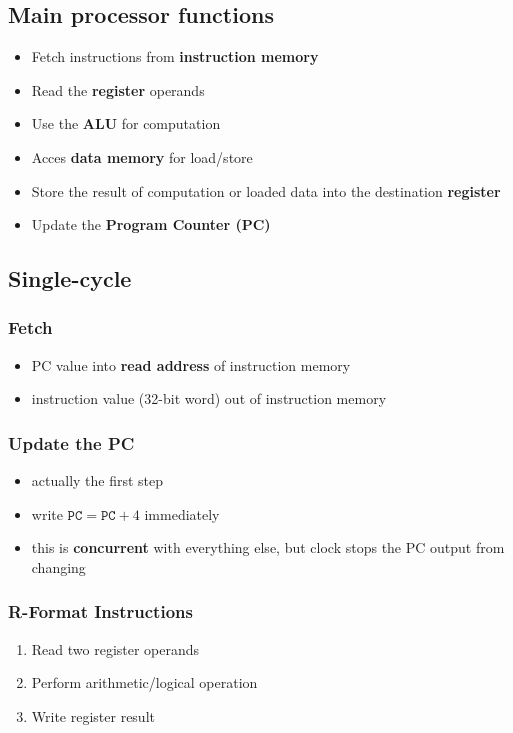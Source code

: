 \documentclass{article}
\begin{document}
\subsection{Main processor functions}
\begin{itemize}
	\item Fetch instructions from \textbf{instruction memory}
	\item Read the \textbf{register} operands
	\item Use the \textbf{ALU} for computation
	\item Acces \textbf{data memory} for load/store
	\item Store the result of computation or loaded data into the destination \textbf{register}
	\item Update the \textbf{Program Counter (PC)}
\end{itemize}
\subsection{Single-cycle}
\subsubsection{Fetch}
\begin{itemize}
	\item PC value into \textbf{read address} of instruction memory
	\item instruction value (32-bit word) out of instruction memory
\end{itemize}
\subsubsection{Update the PC}
\begin{itemize}
	\item actually the first step
	\item write $\texttt{PC}=\texttt{PC}+4$ immediately
	\item this is \textbf{concurrent} with everything else, but clock stops the PC output from changing
\end{itemize}
\subsubsection{R-Format Instructions}
\begin{enumerate}
	\item Read two register operands
	\item Perform arithmetic/logical operation
	\item Write register result
\end{enumerate}
\end{document}
